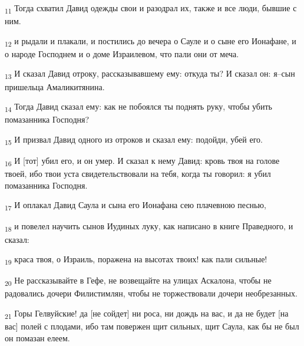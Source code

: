 \begin{tcolorbox}
\textsubscript{11} Тогда схватил Давид одежды свои и разодрал их, также и все люди, бывшие с ним.
\end{tcolorbox}
\begin{tcolorbox}
\textsubscript{12} и рыдали и плакали, и постились до вечера о Сауле и о сыне его Ионафане, и о народе Господнем и о доме Израилевом, что пали они от меча.
\end{tcolorbox}
\begin{tcolorbox}
\textsubscript{13} И сказал Давид отроку, рассказывавшему ему: откуда ты? И сказал он: я--сын пришельца Амаликитянина.
\end{tcolorbox}
\begin{tcolorbox}
\textsubscript{14} Тогда Давид сказал ему: как не побоялся ты поднять руку, чтобы убить помазанника Господня?
\end{tcolorbox}
\begin{tcolorbox}
\textsubscript{15} И призвал Давид одного из отроков и сказал ему: подойди, убей его.
\end{tcolorbox}
\begin{tcolorbox}
\textsubscript{16} И [тот] убил его, и он умер. И сказал к нему Давид: кровь твоя на голове твоей, ибо твои уста свидетельствовали на тебя, когда ты говорил: я убил помазанника Господня.
\end{tcolorbox}
\begin{tcolorbox}
\textsubscript{17} И оплакал Давид Саула и сына его Ионафана сею плачевною песнью,
\end{tcolorbox}
\begin{tcolorbox}
\textsubscript{18} и повелел научить сынов Иудиных луку, как написано в книге Праведного, и сказал:
\end{tcolorbox}
\begin{tcolorbox}
\textsubscript{19} краса твоя, о Израиль, поражена на высотах твоих! как пали сильные!
\end{tcolorbox}
\begin{tcolorbox}
\textsubscript{20} Не рассказывайте в Гефе, не возвещайте на улицах Аскалона, чтобы не радовались дочери Филистимлян, чтобы не торжествовали дочери необрезанных.
\end{tcolorbox}
\begin{tcolorbox}
\textsubscript{21} Горы Гелвуйские! да [не сойдет] ни роса, ни дождь на вас, и да не будет [на вас] полей с плодами, ибо там повержен щит сильных, щит Саула, как бы не был он помазан елеем.
\end{tcolorbox}
